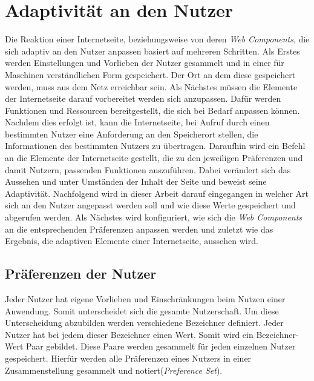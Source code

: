 \documentclass[12pt, paper=a4, bibtotoc, toc=listof, headsepline=true]{scrreprt}
\begin{document}
\chapter{Adaptivität an den Nutzer}
Die Reaktion einer Internetseite, beziehungsweise von deren \emph{Web Components}, die sich adaptiv an den Nutzer anpassen basiert auf mehreren Schritten. Als Erstes werden Einstellungen und Vorlieben der Nutzer gesammelt und in einer für Maschinen verständlichen Form gespeichert. Der Ort an dem diese gespeichert werden, muss aus dem Netz erreichbar sein. Als Nächstes müssen die Elemente der Internetseite darauf vorbereitet werden sich anzupassen. Dafür werden Funktionen und Ressourcen bereitgestellt, die sich bei Bedarf anpassen können. Nachdem dies erfolgt ist, kann die Internetseite, bei Aufruf durch einen bestimmten Nutzer eine Anforderung an den Speicherort stellen, die Informationen des bestimmten Nutzers zu übertragen. Daraufhin wird ein Befehl an die Elemente der Internetseite gestellt, die zu den jeweiligen Präferenzen und damit Nutzern, passenden Funktionen auszuführen. Dabei verändert sich das Aussehen und unter Umständen der Inhalt der Seite und beweist seine Adaptivität.\newline
Nachfolgend wird in dieser Arbeit darauf eingegangen in welcher Art sich an den Nutzer angepasst werden soll und wie diese Werte gespeichert und abgerufen werden. Als Nächstes wird konfiguriert, wie sich die \emph{Web Components} an die entsprechenden Präferenzen anpassen werden und zuletzt wie das Ergebnis, die adaptiven Elemente einer Internetseite, aussehen wird.
\section{Präferenzen der Nutzer}
Jeder Nutzer hat eigene Vorlieben und Einschränkungen beim Nutzen einer Anwendung. Somit unterscheidet sich die gesamte Nutzerschaft. Um diese Unterscheidung abzubilden werden verschiedene Bezeichner definiert. Jeder Nutzer hat bei jedem dieser Bezeichner einen Wert. Somit wird ein Bezeichner-Wert Paar gebildet. Diese Paare werden gesammelt für jeden einzelnen Nutzer gespeichert. Hierfür werden alle Präferenzen eines Nutzers in einer Zusammenstellung gesammelt und notiert(\emph{Preference Set}).
\end{document}
